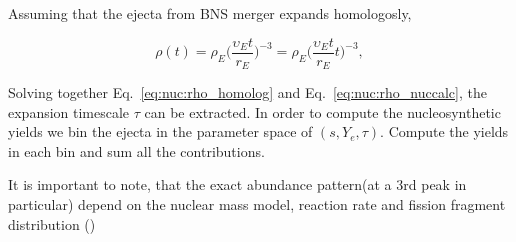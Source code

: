 Assuming that the ejecta from \ac{BNS} merger expands homologosly, 

\begin{equation}
\rho(t) = \rho_E\Big(\frac{\upsilon_E t}{r_E}\Big)^{-3} = 
\rho_E\Big(\frac{\upsilon_E t}{r_E}t\Big)^{-3},
\label{eq:nuc:rho_homolog}
\end{equation}

Solving together Eq.~\eqref{eq:nuc:rho_homolog} and Eq.~\eqref{eq:nuc:rho_nuccalc},
the expansion timescale $\tau$ can be extracted.
%
In order to compute the nucleosynthetic yields we bin the ejecta in the 
parameter space of $(s, Y_e, \tau)$. Compute the yields in each bin and sum 
all the contributions.

It is important to note, that the exact \rproc{} abundance pattern(at a $3$rd peak in particular) 
depend on the nuclear mass model, reaction rate and fission fragment distribution 
(\citep[\eg][]{Goriely:2004qb,Arcones:2010dz,Mumpower:2011ar,Mendoza-Temis:2014mja,Eichler:2014kma})

